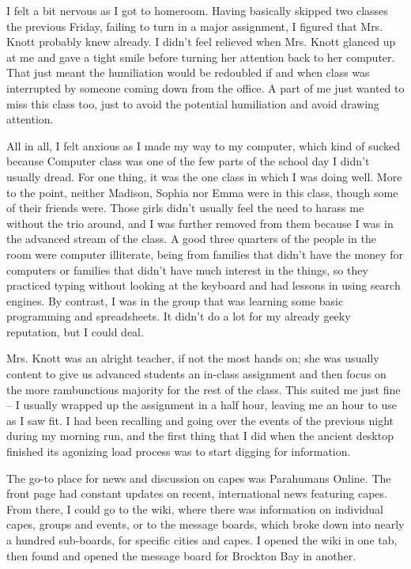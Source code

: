 I felt a bit nervous as I got to homeroom. Having basically skipped two classes the previous Friday, failing to turn in a major assignment, I figured that Mrs. Knott probably knew already. I didn't feel relieved when Mrs. Knott glanced up at me and gave a tight smile before turning her attention back to her computer. That just meant the humiliation would be redoubled if and when class was interrupted by someone coming down from the office. A part of me just wanted to miss this class too, just to avoid the potential humiliation and avoid drawing attention.

All in all, I felt anxious as I made my way to my computer, which kind of sucked because Computer class was one of the few parts of the school day I didn't usually dread. For one thing, it was the one class in which I was doing well. More to the point, neither Madison, Sophia nor Emma were in this class, though some of their friends were. Those girls didn't usually feel the need to harass me without the trio around, and I was further removed from them because I was in the advanced stream of the class. A good three quarters of the people in the room were computer illiterate, being from families that didn't have the money for computers or families that didn't have much interest in the things, so they practiced typing without looking at the keyboard and had lessons in using search engines. By contrast, I was in the group that was learning some basic programming and spreadsheets. It didn't do a lot for my already geeky reputation, but I could deal.

Mrs. Knott was an alright teacher, if not the most hands on; she was usually content to give us advanced students an in-class assignment and then focus on the more rambunctious majority for the rest of the class. This suited me just fine -- I usually wrapped up the assignment in a half hour, leaving me an hour to use as I saw fit. I had been recalling and going over the events of the previous night during my morning run, and the first thing that I did when the ancient desktop finished its agonizing load process was to start digging for information.

The go-to place for news and discussion on capes was Parahumans Online. The front page had constant updates on recent, international news featuring capes. From there, I could go to the wiki, where there was information on individual capes, groups and events, or to the message boards, which broke down into nearly a hundred sub-boards, for specific cities and capes. I opened the wiki in one tab, then found and opened the message board for Brockton Bay in another.

